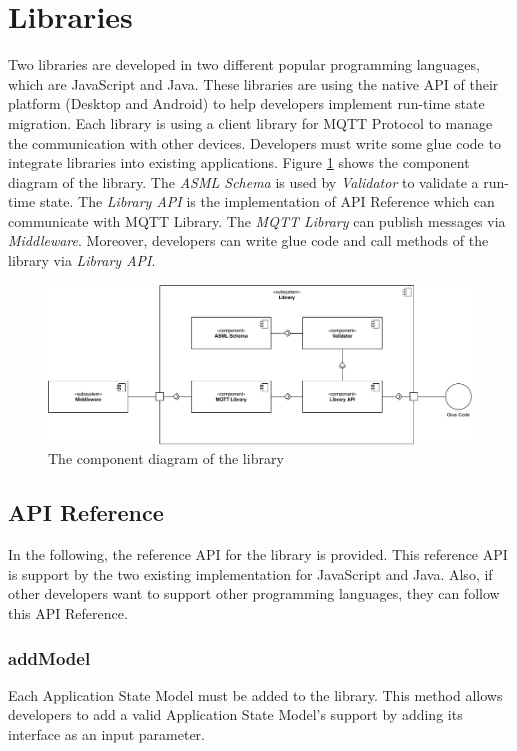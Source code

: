 \section{Libraries}
Two libraries are developed in two different popular programming languages, which are JavaScript and Java. These libraries are using the native API of their platform (Desktop and Android) to help developers implement run-time state migration. Each library is using a client library for MQTT Protocol to manage the communication with other devices. Developers must write some glue code to integrate libraries into existing applications. Figure \ref{fig:libraries-component} shows the component diagram of the library. The \textit{ASML Schema} is used by \textit{Validator} to validate a run-time state. The \textit{Library API} is the implementation of API Reference which can communicate with MQTT Library. The \textit{MQTT Library} can publish messages via \textit{Middleware}. Moreover, developers can write glue code and call methods of the library via \textit{Library API}.

\FloatBarrier
\begin{figure}[H]
    \includegraphics[width=\linewidth]{../figures/libraries-diagram.pdf}
    \centering
    \caption{The component diagram of the library}
    \label{fig:libraries-component}
\end{figure}
\FloatBarrier

\subsection{API Reference}
In the following, the reference API for the library is provided. This reference API is support by the two existing implementation for JavaScript and Java. Also, if other developers want to support other programming languages, they can follow this API Reference. 

\subsubsection{addModel}
Each Application State Model must be added to the library. This method allows developers to add a valid Application State Model's support by adding its interface as an input parameter.

